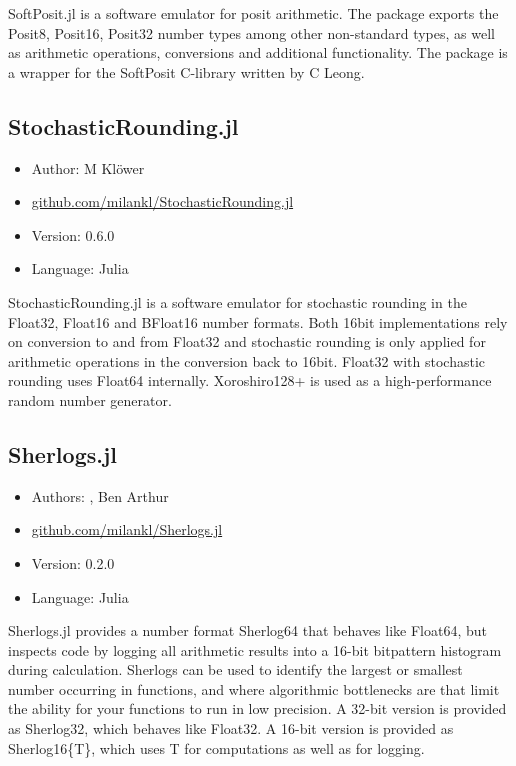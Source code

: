 SoftPosit.jl is a software emulator for posit arithmetic. The package exports the Posit8, Posit16, Posit32 number types among other non-standard types,
as well as arithmetic operations, conversions and additional functionality. The package is a wrapper for the SoftPosit C-library written by C Leong.

\subsection{StochasticRounding.jl}

\begin{itemize}
    \setlength\itemsep{-5pt}
    \item Author: M Klöwer
    \item \href{https://github.com/milankl/StochasticRounding.jl}{github.com/milankl/StochasticRounding.jl}
    \item Version: 0.6.0
    \item Language: Julia
\end{itemize}

StochasticRounding.jl is a software emulator for stochastic rounding in the Float32, Float16 and BFloat16 number formats. Both 16bit implementations
rely on conversion to and from Float32 and stochastic rounding is only applied for arithmetic operations in the conversion back to 16bit. Float32 with
stochastic rounding uses Float64 internally. Xoroshiro128+ is used as a high-performance random number generator.

\subsection{Sherlogs.jl}

\begin{itemize}
    \setlength\itemsep{-5pt}
    \item Authors: \cite{Klower2020}, Ben Arthur
    \item \href{https://github.com/milankl/Sherlogs.jl}{github.com/milankl/Sherlogs.jl}
    \item Version: 0.2.0
    \item Language: Julia
\end{itemize}

Sherlogs.jl provides a number format Sherlog64 that behaves like Float64, but inspects code by logging all arithmetic results into a 16-bit bitpattern histogram
during calculation. Sherlogs can be used to identify the largest or smallest number occurring in functions, and where algorithmic bottlenecks are that limit the
ability for your functions to run in low precision. A 32-bit version is provided as Sherlog32, which behaves like Float32. A 16-bit version is provided as Sherlog16\{T\},
which uses T for computations as well as for logging.

